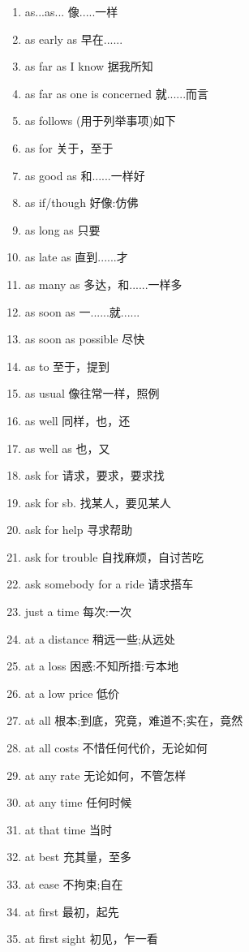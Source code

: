 \documentclass[a4paper,11pt,twocolumn]{ctexart}
\begin{document}
\begin{enumerate}[label=\arabic*., itemsep=0pt, parsep=2pt, topsep=5pt]
    \item as...as... 像.....一样
    \item as early as 早在......
    \item as far as I know 据我所知
    \item as far as one is concerned 就......而言
    \item as follows (用于列举事项)如下
    \item as for 关于，至于
    \item as good as 和......一样好
    \item as if/though 好像:仿佛
    \item as long as 只要
    \item as late as 直到......才
    \item as many as 多达，和......一样多
    \item as soon as 一......就......
    \item as soon as possible 尽快
    \item as to 至于，提到
    \item as usual 像往常一样，照例
    \item as well 同样，也，还
    \item as well as 也，又
    \item ask for 请求，要求，要求找
    \item ask for sb. 找某人，要见某人
    \item ask for help 寻求帮助
    \item ask for trouble 自找麻烦，自讨苦吃
    \item ask somebody for a ride 请求搭车
    \item just a time 每次:一次
    \item at a distance 稍远一些;从远处
    \item at a loss 困惑:不知所措:亏本地
    \item at a low price 低价
    \item at all 根本;到底，究竟，难道不;实在，竟然
    \item at all costs 不惜任何代价，无论如何
    \item at any rate 无论如何，不管怎样
    \item at any time 任何时候
    \item at that time 当时
    \item at best 充其量，至多
    \item at ease 不拘束;自在
    \item at first 最初，起先
    \item at first sight 初见，乍一看

\end{enumerate}
\end{document}
